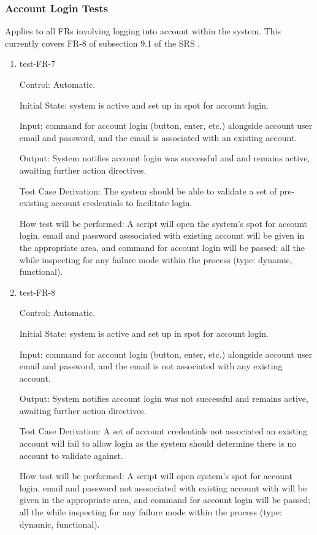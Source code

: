 \documentclass[12pt, titlepage]{article}
\begin{document}
\subsubsection{Account Login Tests}

Applies to all FRs involving logging into account within the system. This 
currently covers FR-8 of subsection 9.1 of the SRS \citep{SRS}.

\begin{enumerate}

\item{test-FR-7\\}

Control: Automatic.
					
Initial State: system is active and set up in spot for account 
login.
					
Input: command for account login (button, enter, etc.) alongside account 
user email and password, and the email is associated with an existing 
account.
					
Output: System notifies account login was successful and and remains 
active, awaiting further action directives.

Test Case Derivation: The system should be able to validate a set of 
pre-existing account credentials to facilitate login.

How test will be performed: A script will open the system's spot for account 
login, email and  password asssociated with existing account will be given 
in the appropriate area, and command for account login will be passed; all 
the while inspecting for any failure mode within the process (type: dynamic, 
functional).

\item{test-FR-8\\}

Control: Automatic.
					
Initial State: system is active and set up in spot for account login.
					
Input: command for account login (button, enter, etc.) alongside account 
user email and password, and the email is not associated with any existing 
account.
					
Output: System notifies account login was not successful and remains 
active, awaiting further action directives.

Test Case Derivation: A set of account credentials not associated an existing 
account will fail to allow login as the system should determine there is no 
account to validate against.

How test will be performed: A script will open system's spot for account login, 
email and password not asssociated with existing account with will be given in 
the appropriate area, and command for account login will be passed; all the 
while inspecting for any failure mode within the process (type: dynamic, functional).
					
\end{enumerate}
\end{document}
